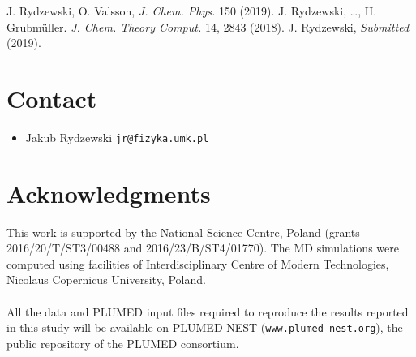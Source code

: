 \documentclass[a0,portrait]{a0poster}
\newcommand{\bi}{\item[\color{myblue}\ding{108}]}
\begin{document}
\begin{multicols}{2}
\color{myblue}
\begin{thebibliography}{6}%
\color{black}
 J. Rydzewski, O. Valsson, \textit{J. Chem. Phys.} 150 (2019).
 J. Rydzewski, \dots, H. Grubm\"{u}ller. \textit{J. Chem. Theory Comput.} 14, 2843 (2018).
 J. Rydzewski, \textit{Submitted} (2019).
\end{thebibliography}
\color{black}

\section*{\color{myblue} Contact}
\begin{itemize}
    \bi Jakub Rydzewski \texttt{jr@fizyka.umk.pl}
\end{itemize}

\section*{\color{myblue} Acknowledgments}
This work is supported by the National Science Centre, Poland (grants
2016/20/T/ST3/00488 and 2016/23/B/ST4/01770). The MD simulations were computed
using facilities of Interdisciplinary Centre of Modern Technologies, Nicolaus
Copernicus University, Poland.
\\
\\
All the data and PLUMED input files required to reproduce the results reported in
this study will be available on PLUMED-NEST (\texttt{www.plumed-nest.org}), the public
repository of the PLUMED consortium. 

\end{multicols}
\end{document}
